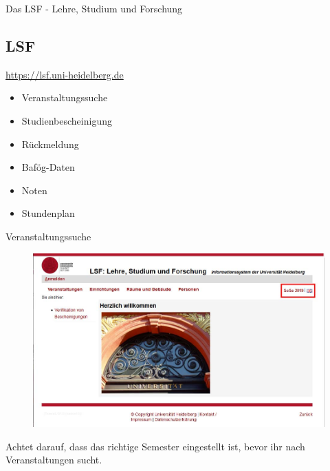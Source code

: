 \begin{frame}{Das LSF - Lehre, Studium und Forschung}
  \subsection{LSF}

  \url{https://lsf.uni-heidelberg.de}

  \begin{center}
  \end{center}

  \begin{itemize}
    \item{Veranstaltungssuche}
    \item{Studienbescheinigung}
    \item{Rückmeldung}
    \item{Bafög-Daten}
    \item{Noten}
    \item{Stundenplan}
  \end{itemize}
\end{frame}

\begin{frame}{Veranstaltungssuche}
  \begin{figure}
       \centering
       \includegraphics[scale=0.3]{images/lsf01.jpg}
  \end{figure}
Achtet darauf, dass das richtige Semester eingestellt ist, bevor ihr nach Veranstaltungen sucht.
\end{frame}

